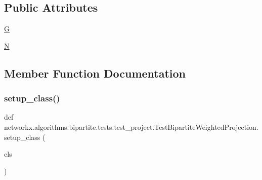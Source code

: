 \subsection*{Public Attributes}
\begin{DoxyCompactItemize}
\item 
\hyperlink{classnetworkx_1_1algorithms_1_1bipartite_1_1tests_1_1test__project_1_1TestBipartiteWeightedProjection_a6201715f23eb51085177c53e1100a289}{G}
\item 
\hyperlink{classnetworkx_1_1algorithms_1_1bipartite_1_1tests_1_1test__project_1_1TestBipartiteWeightedProjection_ac35138bd2550a4ccf1f18d35415a8e3f}{N}
\end{DoxyCompactItemize}


\subsection{Member Function Documentation}
\mbox{\label{classnetworkx_1_1algorithms_1_1bipartite_1_1tests_1_1test__project_1_1TestBipartiteWeightedProjection_a610c0d9618715508b26f3887442ea98f}} 
\subsubsection{\texorpdfstring{setup\+\_\+class()}{setup\_class()}}
{\footnotesize\ttfamily def networkx.\+algorithms.\+bipartite.\+tests.\+test\+\_\+project.\+Test\+Bipartite\+Weighted\+Projection.\+setup\+\_\+class (\begin{DoxyParamCaption}\item[{}]{cls }\end{DoxyParamCaption})}

